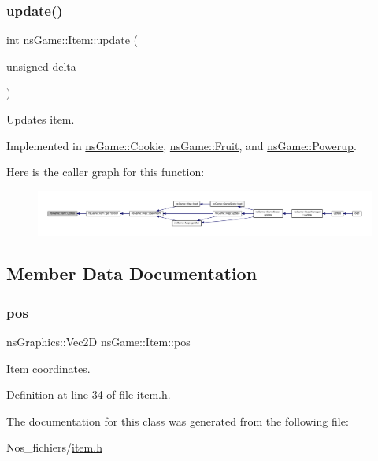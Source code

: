 \subsubsection{\texorpdfstring{update()}{update()}}
{\footnotesize\ttfamily int ns\+Game\+::\+Item\+::update (\begin{DoxyParamCaption}\item[{unsigned}]{delta }\end{DoxyParamCaption})\hspace{0.3cm}{\ttfamily [pure virtual]}}



Updates item. 



Implemented in \hyperlink{classns_game_1_1_cookie_aaea5c3967effe908f2676a5ded17aa39}{ns\+Game\+::\+Cookie}, \hyperlink{classns_game_1_1_fruit_adade5568e2f552576d0d32b714b9ac02}{ns\+Game\+::\+Fruit}, and \hyperlink{classns_game_1_1_powerup_a0f86905ba37cc0a4e80827db0563cfa3}{ns\+Game\+::\+Powerup}.

Here is the caller graph for this function\+:\nopagebreak
\begin{figure}[H]
\begin{center}
\leavevmode
\includegraphics[width=350pt]{structns_game_1_1_item_a96c07d0f91eef0d77e91d1a7397091a1_icgraph}
\end{center}
\end{figure}


\subsection{Member Data Documentation}
\mbox{\label{structns_game_1_1_item_a5518876a13f3d2eda659d29748097f1a}} 
\subsubsection{\texorpdfstring{pos}{pos}}
{\footnotesize\ttfamily ns\+Graphics\+::\+Vec2D ns\+Game\+::\+Item\+::pos\hspace{0.3cm}{\ttfamily [protected]}}



\hyperlink{structns_game_1_1_item}{Item} coordinates. 



Definition at line 34 of file item.\+h.



The documentation for this class was generated from the following file\+:\begin{DoxyCompactItemize}
\item 
Nos\+\_\+fichiers/\hyperlink{item_8h}{item.\+h}\end{DoxyCompactItemize}
